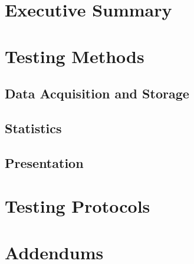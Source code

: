 \documentclass{article}
\begin{document}

\setcounter{tocdepth}{2}
\tableofcontents
\newpage

\listoftables
\listoffigures
\newpage


\section*{Executive Summary}
\label{sec:exec-summary}


\newpage

\section{Testing Methods}
\label{sec:testing-protocols}

\subsection{Data Acquisition and Storage}
\label{sec:data-acqu-stor}

\subsection{Statistics}
\label{sec:statistics}

\subsection{Presentation}
\label{sec:presentation}

\section{Testing Protocols}
\label{sec:protocols}

%
%
%
%


\section{Addendums}
\label{sec:addendums}

\newpage
{}


\end{document}
